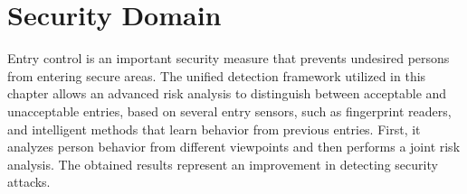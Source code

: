 

%
%
\chapter{Security Domain}
\label{chap:civabis}

% 

Entry control is an important security measure that prevents undesired persons from entering secure areas. The unified detection framework utilized in this chapter allows an advanced risk analysis to distinguish between acceptable and unacceptable entries, based on several entry sensors, such as fingerprint readers, and intelligent methods that learn behavior from previous entries. First, it analyzes person behavior from different viewpoints and then performs a joint risk analysis. The obtained results represent an improvement in detecting security attacks.

%
%

